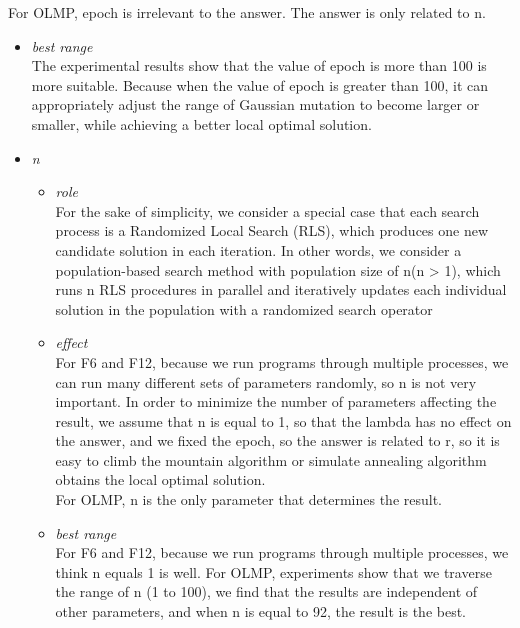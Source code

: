 \documentclass[10pt,letterpaper]{article}
\begin{document}
\begin{itemize}
\begin{itemize}
\begin{itemize}
            For OLMP, epoch is irrelevant to the answer. The answer is only related to n.
        \end{itemize}
        \begin{itemize}
            \item \emph{best range}\\
            The experimental results show that the value of epoch is more than 100 is more suitable. Because when the value of epoch is greater than 100, it can appropriately adjust the range of Gaussian mutation to become larger or smaller, while achieving a better local optimal solution.
        \end{itemize}
    \end{itemize}
    \begin{itemize}
        \item \emph{n}
        \begin{itemize}
            \item \emph{role}\\
            For the sake of simplicity, we consider a special case that each search process is a Randomized Local Search (RLS), which produces one new candidate solution in each iteration. In other words, we consider a population-based search method with population size of n(n > 1), which runs n RLS procedures in parallel and iteratively updates each individual solution in the population with a randomized search operator
        \end{itemize}
        \begin{itemize}
            \item \emph{effect}\\
            For F6 and F12, because we run programs through multiple processes, we can run many different sets of parameters randomly, so n is not very important. In order to minimize the number of parameters affecting the result, we assume that n is equal to 1, so that the lambda has no effect on the answer, and we fixed the epoch, so the answer is related to r, so it is easy to climb the mountain algorithm or simulate annealing algorithm obtains the local optimal solution.\\
            For OLMP, n is the only parameter that determines the result.
        \end{itemize}
        \begin{itemize}
            \item \emph{best range}\\
            For F6 and F12, because we run programs through multiple processes, we think n equals 1 is well.
            For OLMP, experiments show that we traverse the range of n (1 to 100), we find that the results are independent of other parameters, and when n is equal to 92, the result is the best.
        \end{itemize}
    \end{itemize}
\end{itemize}
\end{document}
